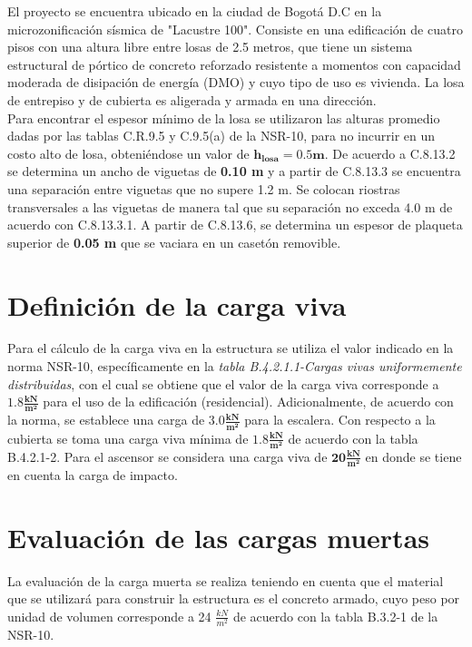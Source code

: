 \documentclass[12pt]{article}
\begin{document}
El proyecto se encuentra ubicado en la ciudad de Bogotá D.C en la microzonificación sísmica de "Lacustre 100". Consiste en una edificación  de cuatro pisos con una altura libre entre losas de 2.5 metros, que tiene un sistema estructural de pórtico de concreto reforzado resistente a momentos con capacidad moderada de disipación de energía (DMO) y cuyo tipo de uso es vivienda. La losa de entrepiso y de cubierta es aligerada y armada en una dirección.\\

Para encontrar el espesor mínimo de la losa se utilizaron las alturas promedio dadas por las tablas C.R.9.5 y C.9.5(a) de la NSR-10, para no incurrir en un costo alto de losa, obteniéndose un valor de $\mathbf{h_{losa}=0.5m}$. De acuerdo a C.8.13.2 se determina un ancho de viguetas de \textbf{0.10 m} y a partir de C.8.13.3 se encuentra una separación entre viguetas que no supere 1.2 m. Se colocan riostras transversales a las viguetas de manera tal que su separación no exceda 4.0 m de acuerdo con C.8.13.3.1. A partir de C.8.13.6, se determina un espesor de plaqueta superior de \textbf{0.05 m} que se vaciara en un casetón removible.\\


\section{Definición de la carga viva}

Para el cálculo de la carga viva en la estructura se utiliza el valor indicado en la norma NSR-10, específicamente en la \textit{tabla B.4.2.1.1-Cargas vivas  uniformemente distribuidas}, con el cual se obtiene que el valor de la carga viva corresponde a $ \mathbf{1.8 \tfrac{kN}{m^{2}}}$ para el uso de la edificación (residencial). Adicionalmente, de acuerdo con la norma, se establece una carga de $ \mathbf{3.0 \tfrac{kN}{m^{2}}}$ para la escalera. Con respecto a la cubierta se toma una carga viva mínima de $ \mathbf{1.8 \tfrac{kN}{m^{2}}}$ de acuerdo con la tabla B.4.2.1-2. Para el ascensor se considera una carga viva de $ \mathbf{20 \tfrac{kN}{m^{2}}}$  en donde se tiene en cuenta la carga de impacto.\\ 

\section{Evaluación de las cargas muertas}

La evaluación de la carga muerta se realiza teniendo en cuenta que el material que se utilizará para construir la estructura es el concreto armado, cuyo peso por unidad de volumen corresponde a 24 $\frac{kN}{m^{2}}$ de acuerdo con la tabla B.3.2-1 de la NSR-10.\\
\end{document}
